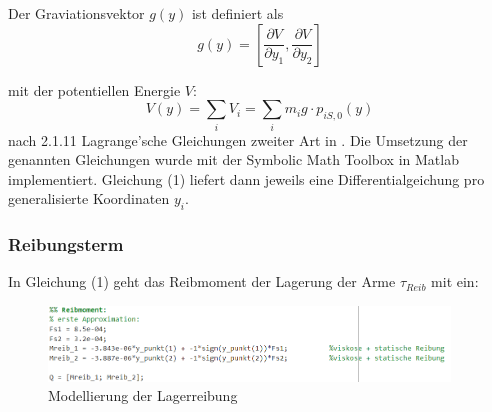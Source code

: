 Der Graviationsvektor $g(y)$ ist definiert als
\begin{equation}
	g(y) = \left[ 
			\frac{\partial{V}}{\partial{y_{1}}} , 
			\frac{\partial{V}}{\partial{y_{2}}}
	\right]
\end{equation}

mit der potentiellen Energie $V$:
\begin{equation}
	V(y) = \sum_{i}V_{i} = \sum_{i}m_{i}g \cdot p_{iS,0}(y) 
\end{equation}
nach 2.1.11 Lagrange'sche Gleichungen zweiter Art in \cite{Fehr23}.
Die Umsetzung der genannten Gleichungen wurde mit der Symbolic Math Toolbox in Matlab implementiert.
Gleichung (1) liefert dann jeweils eine Differentialgeichung pro generalisierte Koordinaten $y_{i}$.



\subsubsection*{Reibungsterm}
In Gleichung (1) geht das Reibmoment der Lagerung der Arme $\tau_{Reib}$ mit ein:
\begin{figure}[H]
	\centering
	\includegraphics[width=0.95\textwidth]{Reibung.png}
	\caption{Modellierung der Lagerreibung}
\end{figure}
